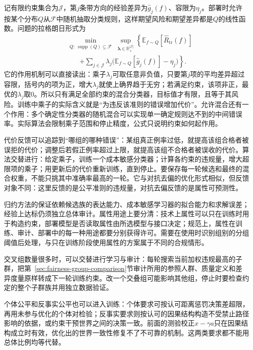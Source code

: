记有限约束集合为$\mathcal J$，第$j$条带方向的经验差异为$\hat g_j(f)$、容限为$\eta_j$。部署时允许按某个分布$Q$从$\mathcal F$中随机抽取分类规则，这样期望风险和期望差异都是$Q$的线性函数。问题的拉格朗日形式为
\begin{equation}
\begin{aligned}
 &\min_{\substack{Q:\ \operatorname{supp}(Q)\subseteq\mathcal F}}
 \sup_{\bm{\lambda}\in\mathbb R_+^{|\mathcal J|}}
 \left\{\mathbb E_{f\sim Q}[\widehat R_{\mathrm{tr}}(f)]\right.\\
 &\qquad\left.+
 \sum_{j\in\mathcal J}\lambda_j
 \bigl(\mathbb E_{f\sim Q}[\hat g_j(f)]-\eta_j\bigr)
 \right\}.
\end{aligned}
 \label{eq:fairness-reduction}
\end{equation}
它的作用机制可以直接读出：乘子$\lambda_j$可取任意非负值，只要第$j$项的平均差异超过容限，括号内的项为正，增大$\lambda_j$就使上确界趋于无穷；若满足约束，该项非正，最优的$\lambda_j$取0。所以只有满足全部约束的混合分类器，目标值才有限，且等于其风险。训练中乘子的实际含义就是“为违反该准则的错误增加代价”。允许混合还有一个作用：多个确定性分类器的随机混合可以实现单一确定规则达不到的中间错误率。实际算法会限制乘子范围和停止精度，公式只说明约束如何起作用。

代价反馈可以追踪到“哪组的哪种错误”：某组真正例率过低，就提高该组合格者被误拒的代价；调整后若假正例率超过上限，就提高该组不合格者被误收的代价。算法交替进行：给定乘子，训练一个成本敏感分类器；计算各约束的违规量，增大超限项的乘子；用更新后的代价重新训练，直到停止。要保存每一轮候选和最终的混合权重，不能只挑其中准确率最高的一轮。它与对抗去偏的优化形式相似，但反馈对象不同：这里反馈的是公平准则的违规量，对抗去偏反馈的是属性可预测性。

归约方法的保证依赖候选族的表达能力、成本敏感学习器的拟合能力和求解误差；经验上达标仍须独立总体审计。属性用途上要分清：技术上属性可以只在训练时用于构造约束，部署模型是否读取属性由所选模型与接口决定；规范上，属性在训练、审计、部署中的每一种用途都要分别获得许可。需要在使用时识别组别的分组阈值后处理，与只在训练阶段使用属性的方案属于不同的合规情形。

交叉组数量很多时，可以交替进行学习与审计：每轮搜索当前加权违规最高的子群，把第~\ref{sec:fairness-group-comparison}节审计所用的参照人群、质量定义和差异度量原样转成下一轮训练约束。改一个交叠组可能影响其他组，停止时要检查约定的整个子群族并用独立数据验证。

个体公平和反事实公平也可以进入训练：个体要求可按认可距离惩罚决策差超限，再用未参与优化的个体对检验；反事实要求则按认可的因果结构构造不受禁止路径影响的依据，或约束干预世界之间的决策一致。前面的测验校正$x-\gamma a$只在因果结构成立时有效，优化出的世界一致性修复不了不可靠的机制。这两类要求都不能用总体比例均等代替。

